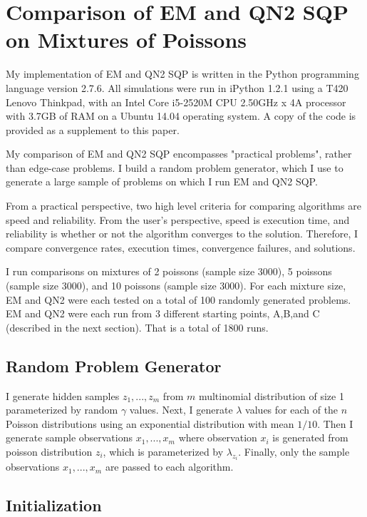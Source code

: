 \documentclass[letter,12pt]{article}
\begin{document}
\section{Comparison of EM and QN2 SQP on Mixtures of Poissons}

My implementation of EM and QN2 SQP is written in the Python programming language version 2.7.6.  All simulations were run in iPython 1.2.1 using a T420 Lenovo Thinkpad, with an Intel Core i5-2520M CPU 2.50GHz x 4A processor with 3.7GB of RAM on a Ubuntu 14.04 operating system.  A copy of the code is provided as a supplement to this paper.

My comparison of EM and QN2 SQP encompasses "practical problems", rather than edge-case problems.  I build a random problem generator, which I use to generate a large sample of problems on which I run EM and QN2 SQP.  

From a practical perspective, two high level criteria for comparing algorithms are speed and reliability.  From the user's perspective, speed is execution time, and reliability is whether or not the algorithm converges to the solution.  Therefore, I compare convergence rates, execution times, convergence failures, and solutions.

I run comparisons on mixtures of 2 poissons (sample size 3000), 5 poissons (sample size 3000), and 10 poissons (sample size 3000).  For each mixture size, EM and QN2 were each tested on a total of 100 randomly generated problems.  EM and QN2 were each run from 3 different starting points, A,B,and C (described in the next section).  That is a total of 1800 runs.

\subsection{Random Problem Generator}

I generate hidden samples $z_1,...,z_m$ from $m$ multinomial distribution of size 1 parameterized by random $\gamma$ values.  Next, I generate $\lambda$ values for each of the $n$ Poisson distributions using an exponential distribution with mean $1/10$.  Then I generate sample observations $x_1,...,x_m$ where observation $x_i$ is generated from poisson distribution $z_i$, which is parameterized by $\lambda_{z_i}$.  Finally, only the sample observations $x_1,...,x_m$ are passed to each algorithm.

\subsection{Initialization}
\end{document}
